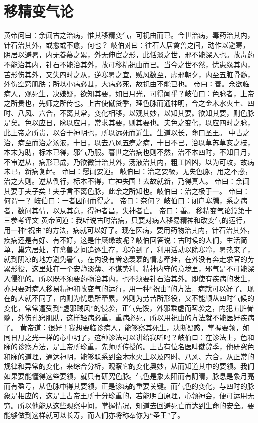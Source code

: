 \documentclass[a4paper,12pt,UTF8,twoside]{ctexbook}
\begin{document}
\chapter{移精变气论}
黄帝问曰：余闻古之治病，惟其移精变气，可祝由而已。今世治病，毒药治其内，针石治其外，或愈或不愈，何也？
岐伯对曰：往石人居禽兽之间，动作以避寒，阴居以避暑，内无眷慕之累，外无伸宦之形，此恬淡之世，邪不能深入也。故毒药不能治其内，针石不能治其外，故可移精祝由而已。当今之世不然，忧患缘其内，苦形伤其外，又失四时之从，逆寒暑之宜，贼风数至，虚邪朝夕，内至五脏骨髓，外伤空窍肌肤；所以小病必甚，大病必死，故祝由不能已也。
帝曰：善。余欲临病人，观死生，决嫌疑，欲知其要，如日月光，可得闻乎？岐伯曰：色脉者，上帝之所贵也，先师之所传也。上古使僦贷季，理色脉而通神明，合之金木水火土、四时、八风、六合，不离其常，变化相移，以观其妙，以知其要。欲知其要，则色脉是矣。色以应日，脉以应月，常求其要，则其要也。夫色之变化，以应四时之脉，此上帝之所贵，以合于神明也，所以远死而近生。生道以长，命曰圣王。
中古之治，病至而治之汤液，十日，以去八风五痹之病，十日不已，治以草苏草亥之枝，本末为助，标本已得，邪气乃服。暮世之治病也则不然，治不本四时，不知日月，不审逆从，病形已成，乃欲微针治其外，汤液治其内，粗工凶凶，以为可攻，故病未已，新病复起。
帝曰：愿闻要道。
岐伯曰：治之要极，无失色脉，用之不惑，治之大则。逆从倒行，标本不得，亡神失国！去故就新，乃得真人。
帝曰：余闻其要于夫子矣！夫子言不离色脉，此余之所知也。岐伯曰：治之极于一。
帝曰：何谓一？
岐伯曰：一者因问而得之。
帝曰：奈何？
岐伯曰：闭户塞牖，系之病者，数问其情，以从其意，得神者昌，失神者亡。
帝曰：善。
移精变气论篇第十三参考译文
黄帝问道：我听说古时治病，只要对病人移易精神和改变气的运行，用一种“祝由”的方法，病就可以好了。现在医病，要用药物治其内，针石治其外，疾病还是有好、有不好，这是什麽缘故呢？岐伯回答说：古时候的人们，生活简单，巢穴居处，在禽兽之间追逐生存，寒冷到了，利用活动以除寒冷，暑热来了，就到阴凉的地方避免暑气，在内没有眷恋羡慕的情志牵挂，在外没有奔走求官的劳累形役，这里处在一个安静淡薄、不谋势利、精神内守的意境里，邪气是不可能深入侵犯的。所以既不须要药物治其内，也不须要针石治其外。即使有疾病的发生，亦只要对病人移易精神和改变气的运行，用一种“祝由”的方法，病就可以好了。现在的人就不同了，内则为忧患所牵累，外则为劳苦所形役，又不能顺从四时气候的变化，常常遭受到“虚邪贼风”的侵袭，正气先馁，外邪乘虚而客袭之，内犯五脏骨髓，外伤孔窍肌肤，这样轻病必重，重病必死，所以用祝由的方法就不能医好疾病了。
黄帝道：很好！我想要临诊病人，能够察其死生，决断疑惑，掌握要领，如同日月之光一样的心中明了，这种诊法可以讲给我听吗？岐伯曰：在诊法上，色和脉的诊察方法，是上帝所珍重，先师所传授的。上古有位名医叫僦贷季，他研究色和脉的道理，通达神明，能够联系到金木水火土以及四时、八风、六合，从正常的规律和异常的变化，来综合分析，观察它的变化奥妙，从而知道其中的要领。我们如果要能懂得这些要领，就只有研究色脉。气色是象太阳而有阴晴，脉息是象月亮而有盈亏，从色脉中得其要领，正是诊病的重要关键。而气色的变化，与四时的脉象是相应的，这是上古帝王所十分珍重的，若能明白原理，心领神会，便可运用无穷。所以他能从这些观察中间，掌握情况，知道去回避死亡而达到生命的安全。要能够做到这样就可以长寿，而人们亦将称奉你为“圣王”了。
\end{document}
